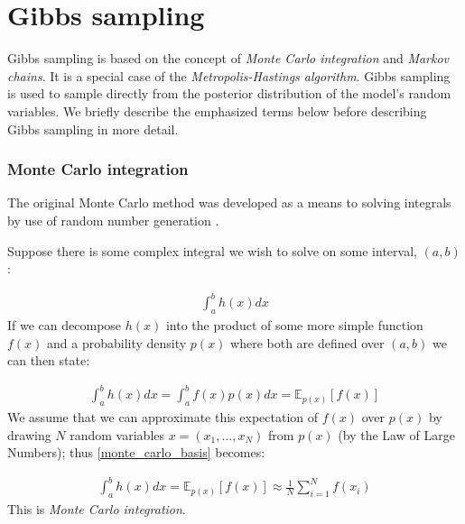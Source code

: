 \documentclass[12pt]{article} %
\begin{document}
	\newpage



%	
	
%	
	
%	
	
	

\newpage

\appendix

\section{Gibbs sampling} \label{sec:additional_theory:sub_sec:gibbs_sampler}
Gibbs sampling is based on the concept of \emph{Monte Carlo integration} and \emph{Markov chains}. It is a special case of the \emph{Metropolis-Hastings algorithm}. Gibbs sampling is used to sample directly from the posterior distribution of the model's random variables. We briefly describe the emphasized terms below before describing Gibbs sampling in more detail.

\subsubsection{Monte Carlo integration}
The original Monte Carlo method was developed as a means to solving integrals by use of random number generation \citep{MetropolisMonteCarloMethod1949}.

Suppose there is some complex integral we wish to solve on some interval, $(a,b)$:

\begin{align}
\int_a^b h(x) dx
\end{align}
If we can decompose $h(x)$ into the product of some more simple function $f(x)$ and a probability density $p(x)$ where both are defined over $(a,b)$ we can then state:

\begin{align} \label{monte_carlo_basis}
\int_a^bh(x)dx = \int_a^bf(x)p(x)dx = \mathbb{E}_{p(x)}\left[f(x)\right]
\end{align}
We assume that we can approximate this expectation of $f(x)$ over $p(x)$ by drawing $N$ random variables $x = (x_1,\ldots,x_N)$ from $p(x)$ (by the Law of Large Numbers); thus \eqref{monte_carlo_basis} becomes:

\begin{align} \label{monte_carlo_integration}
\int_a^bh(x)dx = \mathbb{E}_{p(x)}\left[f(x)\right] \approx \frac{1}{N}\sum_{i=1}^Nf(x_i)
\end{align}
This is \emph{Monte Carlo integration}.
\end{document}
